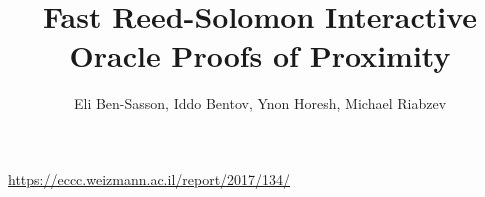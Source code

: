 
\begin{bibliography}
    \title{Fast Reed-Solomon Interactive Oracle Proofs of Proximity}
    \author{Eli Ben-Sasson, Iddo Bentov, Ynon Horesh, Michael Riabzev}
    \url{https://eccc.weizmann.ac.il/report/2017/134/}

\end{bibliography}